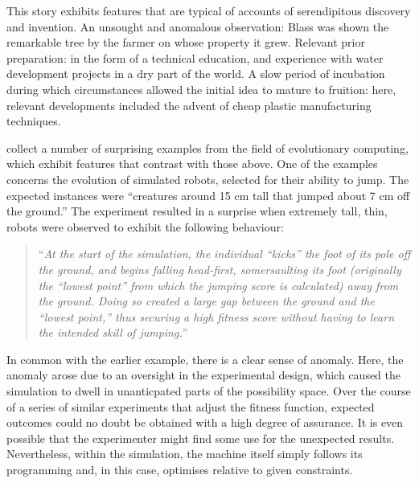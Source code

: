 
This story exhibits features that are typical of accounts of serendipitous discovery and invention.  An unsought and anomalous observation: Blass was shown the remarkable tree by the farmer on whose property it grew. Relevant prior preparation: in the form of a technical education, and experience with water development projects in a dry part of the world.  A slow period of incubation during which circumstances allowed the initial idea to mature to fruition: here, relevant developments included the advent of cheap plastic manufacturing techniques.

\citet{alife2018cases} collect a number of surprising examples from the field of evolutionary computing, which exhibit features that contrast with those above.  One of the examples concerns the evolution of simulated robots, selected for their ability to jump.  The expected instances were ``creatures around 15 cm tall that jumped about 7 cm off the ground.''  The experiment resulted in a surprise when extremely tall, thin, robots were observed to exhibit the following behaviour:
\begin{quote}
``\emph{At the start of the simulation, the individual “kicks” the foot of its pole off the ground, and begins falling head-first, somersaulting its foot (originally the “lowest point” from which the jumping score is calculated) away from the ground. Doing so created a large gap between the ground and the “lowest point,” thus securing a high fitness score without having to learn the intended skill of jumping.}''
\end{quote}

In common with the earlier example, there is a clear sense of anomaly.  Here, the anomaly arose due to an oversight in the experimental design, which caused the simulation to dwell in unanticpated parts of the possibility space.    Over the course of a series of similar experiments that adjust the fitness function, expected outcomes could no doubt be obtained with a high degree of assurance.  It is even possible that the experimenter might find some use for the unexpected results.  Nevertheless, within the simulation, the machine itself simply follows its programming and, in this case, optimises relative to given constraints.

